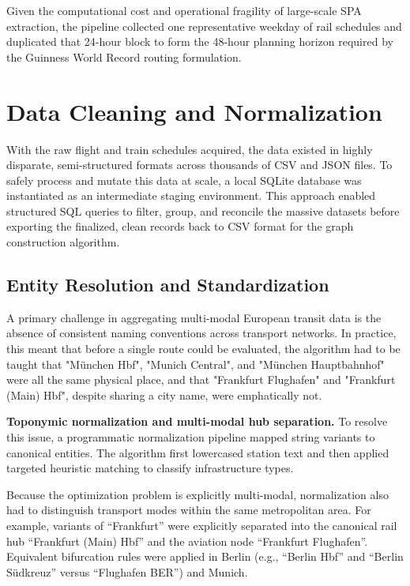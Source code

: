 Given the computational cost and operational fragility of large-scale SPA extraction, the pipeline collected one representative weekday of rail schedules and duplicated that 24-hour block to form the 48-hour planning horizon required by the Guinness World Record routing formulation.

\section{Data Cleaning and Normalization}
\label{sec:cleaning_normalization}
With the raw flight and train schedules acquired, the data existed in highly disparate, semi-structured formats across thousands of CSV and JSON files. To safely process and mutate this data at scale, a local SQLite database was instantiated as an intermediate staging environment. This approach enabled structured SQL queries to filter, group, and reconcile the massive datasets before exporting the finalized, clean records back to CSV format for the graph construction algorithm.

\subsection{Entity Resolution and Standardization}
\label{subsec:entity_resolution_standardization}
A primary challenge in aggregating multi-modal European transit data is the absence of consistent naming conventions across transport networks. In practice, this meant that before a single route could be evaluated, the algorithm had to be taught that "München Hbf", "Munich Central", and "München Hauptbahnhof" were all the same physical place, and that "Frankfurt Flughafen" and "Frankfurt (Main) Hbf", despite sharing a city name, were emphatically not.

\medskip

\noindent\textbf{Toponymic normalization and multi-modal hub separation.}
To resolve this issue, a programmatic normalization pipeline mapped string variants to canonical entities. The algorithm first lowercased station text and then applied targeted heuristic matching to classify infrastructure types.

\medskip

Because the optimization problem is explicitly multi-modal, normalization also had to distinguish transport modes within the same metropolitan area. For example, variants of ``Frankfurt'' were explicitly separated into the canonical rail hub ``Frankfurt (Main) Hbf'' and the aviation node ``Frankfurt Flughafen''. Equivalent bifurcation rules were applied in Berlin (e.g., ``Berlin Hbf'' and ``Berlin S\"udkreuz'' versus ``Flughafen BER'') and Munich.

